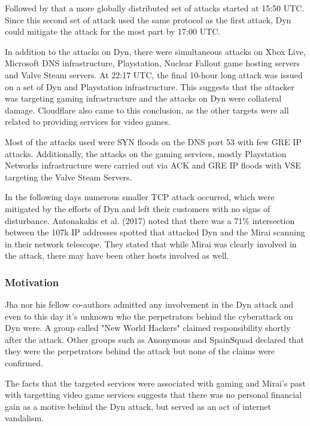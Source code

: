 Followed by that a more globally distributed set of attacks started at 15:50 UTC. Since this second set of attack used the same protocol as the first attack, Dyn could mitigate the attack for the most part by 17:00 UTC. \cite{Dyn16}
 
In addition to the attacks on Dyn, there were simultaneous attacks on Xbox Live, Microsoft DNS infrastructure, Playstation, Nuclear Fallout game hosting servers and Valve Steam servers. At 22:17 UTC, the final 10-hour long attack was issued on a set of Dyn and Playstation infrastructure. \cite{Antonakakis17}
This suggests that the attacker was targeting gaming infrastructure and the attacks on Dyn were collateral damage. Cloudflare also came to this conclusion, as the other targets were all related to providing services for video games. \cite{Cloudflare17}

Most of the attacks used were SYN floods on the DNS port 53 with few GRE IP attacks. Additionally, the attacks on the gaming services, mostly Playstation Networks infrastructure were carried out via ACK and GRE IP floods with VSE targeting the Valve Steam Servers. \cite{Antonakakis17}

In the following days numerous smaller TCP attack occurred, which were mitigated by the efforts of Dyn and left their customers with no signs of disturbance. \cite{Dyn16} Antonakakis et al. (2017) noted that there was a 71\% intersection between the 107k IP addresses spotted that attacked Dyn and the Mirai scanning in their network telescope. They stated that while Mirai was clearly involved in the attack, there may have been other hosts involved as well. \cite{Antonakakis17}

		\subsubsection{Motivation}
Jha nor his fellow co-authors admitted any involvement in the Dyn attack and even to this day it's unknown who the perpetrators behind the cyberattack on Dyn were. A group called "New World Hackers" claimed responsibility shortly after the attack. Other groups such as Anonymous and SpainSquad declared that they were the perpetrators behind the attack but none of the claims were confirmed. \cite{Lewis17}

The facts that the targeted services were associated with gaming and Mirai's past with targetting video game services suggests that there was no personal financial gain as a motive behind the Dyn attack, but served as an act of internet vandalism.

